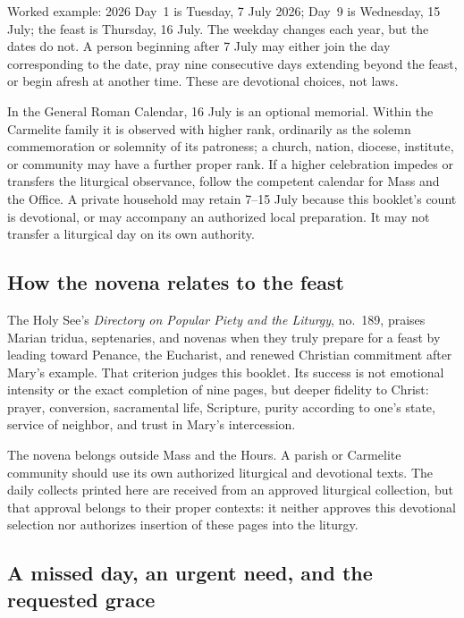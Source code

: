 \begin{studybox}{Worked example: 2026}
Day~1 is Tuesday, 7 July 2026; Day~9 is Wednesday, 15 July; the feast is Thursday, 16 July. The weekday changes each year, but the dates do not. A person beginning after 7 July may either join the day corresponding to the date, pray nine consecutive days extending beyond the feast, or begin afresh at another time. These are devotional choices, not laws.
\end{studybox}

In the General Roman Calendar, 16 July is an optional memorial. Within the Carmelite family it is observed with higher rank, ordinarily as the solemn commemoration or solemnity of its patroness; a church, nation, diocese, institute, or community may have a further proper rank. If a higher celebration impedes or transfers the liturgical observance, follow the competent calendar for Mass and the Office. A private household may retain 7--15 July because this booklet's count is devotional, or may accompany an authorized local preparation. It may not transfer a liturgical day on its own authority.

\subsection{How the novena relates to the feast}

The Holy See's \textit{Directory on Popular Piety and the Liturgy}, no.~189, praises Marian tridua, septenaries, and novenas when they truly prepare for a feast by leading toward Penance, the Eucharist, and renewed Christian commitment after Mary's example. That criterion judges this booklet. Its success is not emotional intensity or the exact completion of nine pages, but deeper fidelity to Christ: prayer, conversion, sacramental life, Scripture, purity according to one's state, service of neighbor, and trust in Mary's intercession.

The novena belongs outside Mass and the Hours. A parish or Carmelite community should use its own authorized liturgical and devotional texts. The daily collects printed here are received from an approved liturgical collection, but that approval belongs to their proper contexts: it neither approves this devotional selection nor authorizes insertion of these pages into the liturgy.

\subsection{A missed day, an urgent need, and the requested grace}

